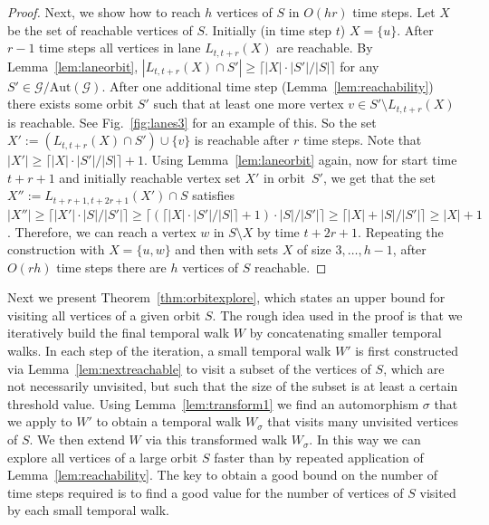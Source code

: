\documentclass[10pt,a4paper]{article}
\newcommand{\auttg}{\ensuremath{\text{Aut}(\mathcal{G})}}
\newcommand{\torb}{\ensuremath{\mathcal{G}/\auttg}}
\begin{document}
{\begin{proof}
    Next, we show how to reach $h$ vertices of $S$ in $O(hr)$ time steps.
        Let $X$ be the set of reachable vertices
        of $S$. Initially (in time step $t$) $X=\{u\}$. After $r-1$ time steps
        all vertices in lane $L_{t, t+r}(X)$ are reachable. By
        Lemma~\ref{lem:laneorbit}, $|L_{t, t+r}(X)\cap S'|\geq \lceil |X| \cdot
        |S'|/|S| \rceil$ for any $S' \in \torb$. %
        After one additional time step (Lemma~\ref{lem:reachability}) there
        exists some orbit $S'$ such that at least one more vertex $v \in
        S'\setminus L_{t, t+r}(X)$ is reachable. {See
        Fig.~\ref{fig:lanes3} for an example of this.} So the set $X' :=
        (L_{t, t+r}(X) \cap S')\cup \{v\}$ is reachable after $r$ time steps.
        Note that $|X'| \geq \lceil |X| \cdot |S'|/|S| \rceil + 1$. Using
        Lemma~\ref{lem:laneorbit} again, now for start time $t+r+1$ and
        initially reachable vertex set $X'$ in orbit~$S'$, we get that the set
        $X'':= L_{t+r+1, t+2r+1}(X') \cap S$ satisfies $|X''| \geq \lceil |X'|
        \cdot |S|/|S'| \rceil \geq \lceil( \lceil|X| \cdot |S'|/|S|\rceil+1)
        \cdot |S|/|S'|\rceil \geq \lceil |X| + |S|/|S'| \rceil \ge |X|+1$.
        Therefore, we can reach a vertex $w$ in $S \setminus X$ by time
        $t+2r+1$. Repeating the construction with $X=\{u, w\}$ and then with
        sets $X$ of size $3, \ldots, h-1$, after $O(rh)$ time steps there are
        $h$ vertices of $S$ reachable.
\end{proof}
}
\full{\proofnextreachable}


    Next we present Theorem~\ref{thm:orbitexplore}, which states an upper bound
    for visiting all vertices of a given orbit $S$. The rough idea used in the
    proof is that we iteratively build the final temporal walk $W$ by
    concatenating smaller temporal walks. In each step of the iteration, a small
    temporal walk $W'$ is first constructed via Lemma~\ref{lem:nextreachable} to
    visit a subset of the vertices of $S$, which are not necessarily unvisited,
    but such that the size of the subset is at least a certain threshold value.
    Using Lemma~\ref{lem:transform1} we find an automorphism $\sigma$ that we
    apply to $W'$ to obtain a temporal walk $W_{\sigma}$ that visits many
    unvisited vertices of $S$. We then extend $W$ via this transformed walk
    $W_{\sigma}$. In this way we can explore all vertices of a large orbit $S$ faster
    than by repeated application of Lemma~\ref{lem:reachability}. The key to
    obtain a good bound on the number of time steps required is to find a good
    value for the number of vertices of $S$ visited by each small temporal walk.
\end{document}
